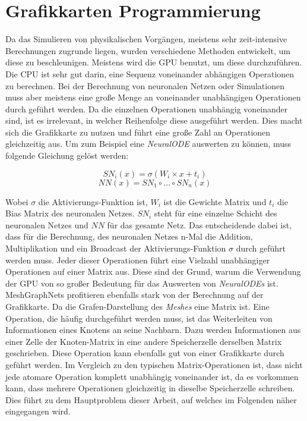 
\section{Grafikkarten Programmierung} \label{sec:gpu}

Da das Simulieren von physikalischen Vorgängen, 
meistens sehr zeit-intensive Berechnungen zugrunde liegen, 
wurden verschiedene Methoden entwickelt, 
um diese zu beschleunigen.
Meistens wird die GPU benutzt, um diese durchzuführen.
Die CPU ist sehr gut darin, eine Sequenz voneinander abhängigen Operationen zu berechnen.
Bei der Berechnung von neuronalen Netzen oder Simulationen muss aber meistens eine große Menge 
an voneinander unabhängigen Operationen durch geführt werden.
Da die einzelnen Operationen unabhängig voneinander sind, ist es irrelevant, in welcher Reihenfolge diese ausgeführt werden.
Dies macht sich die Grafikkarte zu nutzen und führt eine große Zahl an Operationen gleichzeitig aus.
Um zum Beispiel eine \textit{NeuralODE} auswerten zu können, muss folgende Gleichung gelöst werden:

$$
SN_i(x) = \sigma ( W_i \times x + t_i )
$$
$$
NN(x) = SN_1 \circ ... \circ SN_n (x)
$$

Wobei $\sigma$ die Aktivierungs-Funktion ist, $W_i$ ist die Gewichte Matrix und $t_i$ die Bias Matrix des neuronalen Netzes.
$SN_i$ steht für eine einzelne Schicht des neuronalen Netzes und $NN$ für das gesamte Netz.
Das entscheidende dabei ist, dass für die Berechnung, des neuronalen Netzes n-Mal die Addition, Multiplikation und ein Broadcast der Aktivierungs-Funktion
$\sigma$ durch geführt werden muss.
Jeder dieser Operationen führt eine Vielzahl unabhängiger Operationen auf einer Matrix aus.
Diese sind der Grund, warum die Verwendung der GPU von so großer Bedeutung für das Auswerten von \textit{NeuralODEs} ist.
MeshGraphNets profitieren ebenfalls stark von der Berechnung auf der Grafikkarte.
Da die Grafen-Darstellung des \textit{Meshes} eine Matrix ist.
Eine Operation, die häufig durchgeführt werden muss, ist das Weiterleiten von Informationen eines Knotens an seine Nachbarn.
Dazu werden Informationen aus einer Zelle der Knoten-Matrix in eine andere Speicherzelle derselben Matrix geschrieben.
Diese Operation kann ebenfalls gut von einer Grafikkarte durch geführt werden.
Im Vergleich zu den typischen Matrix-Operationen ist, dass nicht jede atomare Operation komplett unabhängig voneinander ist,
da es vorkommen kann, dass mehrere Operationen gleichzeitig in dieselbe Speicherzelle schreiben.
Dies führt zu dem Hauptproblem dieser Arbeit, auf welches im Folgenden näher eingegangen wird.










% 